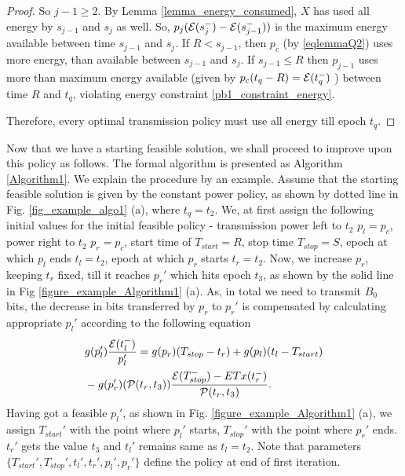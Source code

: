 \begin{proof}
So ${j-1}\ge 2$. By Lemma \ref{lemma_energy_consumed}, $X$ has used all energy by $s_{j-1}$ and $s_{j}$ as well. So, $p_{j}(\mathcal{E}(s_{j}^-)-\mathcal{E}(s_{j-1}^-))$ is the maximum energy available between time $s_{j-1}$ and $s_{j}$. If $R<s_{j-1}$, then $p_c$ (by \eqref{eqlemmaQ2}) uses more energy, than available between $s_{j-1}$ and $s_{j}$. If $s_{j-1}\le R$ then $p_{j-1}$ uses more than maximum energy available (given by $p_c(t_q-R)=\mathcal{E}(t_q^-)$ ) between time $R$ and $t_q$, violating energy constraint \eqref{pb1_constraint_energy}. 

Therefore, every optimal transmission policy must use all energy till epoch $t_q$. 

\end{proof}

Now that we have a starting feasible solution, we shall proceed to improve upon this policy as follows. The formal algorithm is presented as Algorithm \ref{Algorithm1}. We explain the procedure by an example. Assume that the starting feasible solution is given by the constant power policy, as shown by dotted line in Fig. \ref{fig_example_algo1} (a), where $t_q=t_2$. We, at first assign the following initial values for the initial feasible policy - transmission power left to $t_2$ $p_l=p_c$, power right to $t_2$ $p_r=p_c$, start time of $T_{start}=R$, stop time $T_{stop}=S$, epoch at which $p_l$ ends $t_l=t_2$, epoch at which $p_r$ starts $t_r=t_2$. Now, we increase $p_r$, keeping $t_r$ fixed, till it reaches $p_r'$ which hits epoch $t_3$, as shown by the solid line in Fig \ref{figure_example_Algorithm1} (a). As, in total we need to transmit $B_0$ bits, the decrease in bits transferred by $p_r$ to $p_r'$ is compensated by calculating appropriate $p_l'$ according to the following equation
\begin{align}
&g(p_l')\frac{\mathcal{E}(t_l^-)}{p_l'}=g(p_r)(T_{stop}-t_r)+g(p_l)(t_l-T_{start})\nonumber\\
&-g(p_r')(\mathcal{P}(t_r,t_3))\frac{\mathcal{E}(T_{stop}^-)-ETx(t_r^-)}{\mathcal{P}(t_r,t_3)}.
\end{align}   
Having got a feasible $p_l'$, as shown in Fig. \ref{figure_example_Algorithm1} (a), we assign $T_{start}'$ with the point where $p_l'$ starts, $T_{stop}'$ with the point where $p_r'$ ends. $t_r'$ gets the value $t_3$ and $t_l'$ remains same as $t_l=t_2$. Note that parameters $\{T_{start}',T_{stop}',t_l',t_r',p_l',p_r'\}$ define the policy at end of first iteration. 

